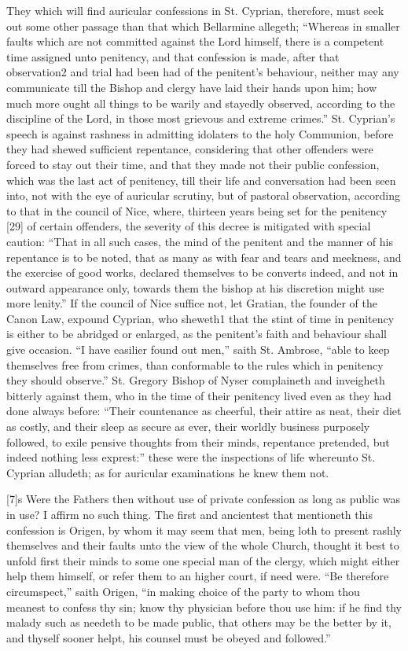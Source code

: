They which will find auricular confessions in St. Cyprian, therefore, must seek out some other passage than that which Bellarmine allegeth; “Whereas in smaller faults which are not committed against the Lord himself, there is a competent time assigned unto penitency, and that confession is made, after that observation2 and trial had been had of the penitent’s behaviour, neither may any communicate till the Bishop and clergy have laid their hands upon him; how much more ought all things to be warily and stayedly observed, according to the discipline of the Lord, in those most grievous and extreme crimes.” St. Cyprian’s speech is against rashness in admitting idolaters to the holy Communion, before they had shewed sufficient repentance, considering that other offenders were forced to stay out their time, and that they made not their public confession, which was the last act of penitency, till their life and conversation had been seen into, not with the eye of auricular scrutiny, but of pastoral observation, according to that in the council of Nice, where, thirteen years being set for the penitency [29] of certain offenders, the severity of this decree is mitigated with special caution: “That in all such cases, the mind of the penitent and the manner of his repentance is to be noted, that as many as with fear and tears and meekness, and the exercise of good works, declared themselves to be converts indeed, and not in outward appearance only, towards them the bishop at his discretion might use more lenity.” If the council of Nice suffice not, let Gratian, the founder of the Canon Law, expound Cyprian, who sheweth1 that the stint of time in penitency is either to be abridged or enlarged, as the penitent’s faith and behaviour shall give occasion. “I have easilier found out men,” saith St. Ambrose, “able to keep themselves free from crimes, than conformable to the rules which in penitency they should observe.” St. Gregory Bishop of Nyser complaineth and inveigheth bitterly against them, who in the time of their penitency lived even as they had done always before: “Their countenance as cheerful, their attire as neat, their diet as costly, and their sleep as secure as ever, their worldly business purposely followed, to exile pensive thoughts from their minds, repentance pretended, but indeed nothing less exprest:” these were the inspections of life whereunto St. Cyprian alludeth; as for auricular examinations he knew them not.

[7]s Were the Fathers then without use of private confession as long as public was in use? I affirm no such thing.  The first and ancientest that mentioneth this confession is Origen, by whom it may seem that men, being loth to present rashly themselves and their faults unto the view of the whole Church, thought it best to unfold first their minds to some one special man of the clergy, which might either help them himself, or refer them to an higher court, if need were. “Be therefore circumspect,” saith Origen, “in making choice of the party to whom thou meanest to confess thy sin; know thy physician before thou use him: if he find thy malady such as needeth to be made public, that others may be the better by it, and thyself sooner helpt, his counsel must be obeyed and followed.”

